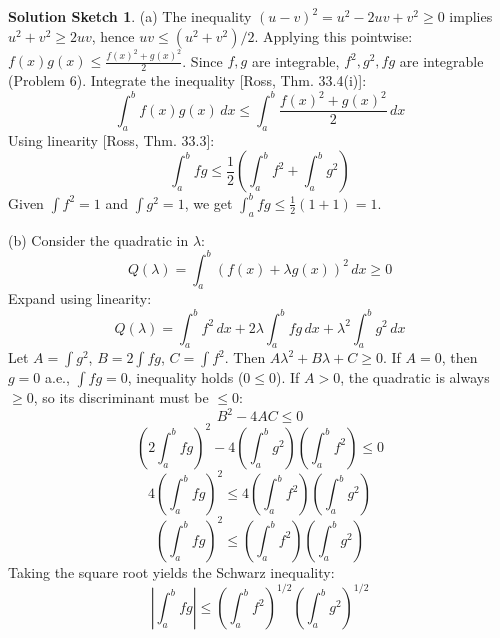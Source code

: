 \documentclass{article}
\theoremstyle{definition} %
\theoremstyle{definition} %
\newtheorem*{solution}{Solution Sketch}
\begin{document}
\begin{solution}
(a) The inequality $(u-v)^2 = u^2 - 2uv + v^2 \ge 0$ implies $u^2+v^2 \ge 2uv$, hence $uv \le (u^2+v^2)/2$.
Applying this pointwise: $f(x)g(x) \le \frac{f(x)^2 + g(x)^2}{2}$.
Since $f, g$ are integrable, $f^2, g^2, fg$ are integrable (Problem 6). Integrate the inequality [Ross, Thm. 33.4(i)]:
\[ \int_a^b f(x)g(x) \, dx \le \int_a^b \frac{f(x)^2 + g(x)^2}{2} \, dx \]
Using linearity [Ross, Thm. 33.3]:
\[ \int_a^b fg \le \frac{1}{2} \left( \int_a^b f^2 + \int_a^b g^2 \right) \]
Given $\int f^2 = 1$ and $\int g^2 = 1$, we get $\int_a^b fg \le \frac{1}{2}(1+1) = 1$.

(b) Consider the quadratic in $\lambda$:
\[ Q(\lambda) = \int_a^b (f(x) + \lambda g(x))^2 \, dx \ge 0 \]
Expand using linearity:
\[ Q(\lambda) = \int_a^b f^2 \, dx + 2\lambda \int_a^b fg \, dx + \lambda^2 \int_a^b g^2 \, dx \]
Let $A = \int g^2$, $B = 2 \int fg$, $C = \int f^2$. Then $A\lambda^2 + B\lambda + C \ge 0$.
If $A=0$, then $g=0$ a.e., $\int fg = 0$, inequality holds ($0 \le 0$).
If $A > 0$, the quadratic is always $\ge 0$, so its discriminant must be $\le 0$:
\[ B^2 - 4AC \le 0 \]
\[ \left( 2 \int_a^b fg \right)^2 - 4 \left( \int_a^b g^2 \right) \left( \int_a^b f^2 \right) \le 0 \]
\[ 4 \left( \int_a^b fg \right)^2 \le 4 \left( \int_a^b f^2 \right) \left( \int_a^b g^2 \right) \]
\[ \left( \int_a^b fg \right)^2 \le \left( \int_a^b f^2 \right) \left( \int_a^b g^2 \right) \]
Taking the square root yields the Schwarz inequality:
\[ \left| \int_a^b fg \right| \le \left( \int_a^b f^2 \right)^{1/2} \left( \int_a^b g^2 \right)^{1/2} \]


\end{solution}
\end{document}
